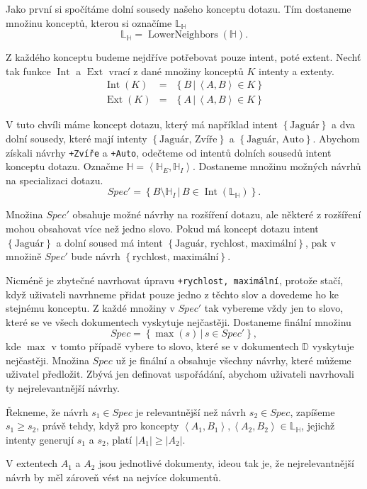 \documentclass[12pt]{article}
\newcommand{\code}[1]{\texttt{#1}}
\newcommand{\sep}{\,|\,}
\newcommand{\adds}[1]{\left\{#1\right\}}
\newcommand{\addsp}[1]{\left<#1\right>}
\DeclareMathOperator{\ext}{Ext}
\DeclareMathOperator{\intfca}{Int}
\DeclareMathOperator{\lowerneighbors}{LowerNeighbors}
\newcommand{\alldoc}{\mathbb{D}}
\newcommand{\hledany}{\mathbb{H}}
\newcommand{\lowerc}{\mathbb{L}}
\begin{document}
Jako první si spočítáme dolní sousedy našeho konceptu dotazu. Tím dostaneme množinu konceptů, kterou si označíme $\lowerc_\hledany$
$$
\lowerc_\hledany=\lowerneighbors(\hledany).
$$

Z každého konceptu budeme nejdříve potřebovat pouze intent, poté extent. Nechť tak funkce $\intfca$ a $\ext$ vrací z dané množiny konceptů $K$ intenty a extenty.
\begin{eqnarray}
\intfca(K)&=&\adds{B\sep \addsp{A, B} \in K}\\
\ext(K)&=&\adds{A\sep \addsp{A, B} \in K}
\end{eqnarray}

V tuto chvíli máme koncept dotazu, který má například intent $\adds{\mbox{Jaguár}}$ a dva dolní sousedy, které mají intenty $\adds{\mbox{Jaguár, Zvíře}}$ a $\adds{\mbox{Jaguár, Auto}}$. Abychom získali návrhy \code{+Zvíře} a \code{+Auto}, odečteme od intentů dolních sousedů intent konceptu dotazu. Označme $\hledany=\addsp{\hledany_E, \hledany_I}$. Dostaneme množinu možných návrhů na specializaci dotazu. 
$$
Spec'=\adds{B\setminus\hledany_I\sep B \in \intfca(\lowerc_\hledany)}. 
$$

Množina $Spec'$ obsahuje možné návrhy na rozšíření dotazu, ale některé z rozšíření mohou obsahovat více než jedno slovo. Pokud má koncept dotazu intent $\adds{\mbox{Jaguár}}$ a dolní soused má intent $\adds{\mbox{Jaguár, rychlost, maximální}}$, pak v množině $Spec'$ bude návrh $\adds{\mbox{rychlost, maximální}}$. 

Nicméně je zbytečné navrhovat úpravu \code{+rychlost, maximální}, protože stačí, když uživateli navrhneme přidat pouze jedno z těchto slov a dovedeme ho ke stejnému konceptu. Z každé množiny v $Spec'$ tak vybereme vždy jen to slovo, které se ve všech dokumentech vyskytuje nejčastěji. Dostaneme finální množinu
$$
Spec=\adds{\max(s)\sep s\in Spec'},
$$
kde $\max$ v tomto případě vybere to slovo, které se v dokumentech $\alldoc$ vyskytuje nejčastěji. Množina $Spec$ už je finální a obsahuje všechny návrhy, které můžeme uživatel předložit. Zbývá jen definovat uspořádání, abychom uživateli navrhovali ty nejrelevantnější návrhy. 

Řekneme, že návrh $s_1 \in Spec$ je relevantnější než návrh $s_2 \in Spec$, zapíšeme $s_1 \ge s_2$, právě tehdy, když pro koncepty $\addsp{A_1, B_1}, \addsp{A_2, B_2} \in \lowerc_\hledany$, jejichž intenty generují $s_1$ a $s_2$, platí $|A_1|\ge|A_2|$. 

V extentech $A_1$ a $A_2$ jsou jednotlivé dokumenty, ideou tak je, že nejrelevantnější návrh by měl zároveň vést na nejvíce dokumentů. 
\end{document}
